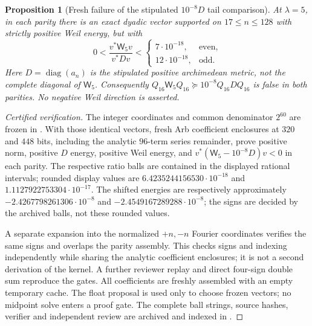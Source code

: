 \documentclass[11pt]{article}
\newtheorem{proposition}[theorem]{Proposition}
\theoremstyle{remark}
\begin{document}
\begin{proposition}[Fresh failure of the stipulated $10^{-8}D$ tail comparison]
\label{prop:v152-tail-comparison}
At $\lambda=5$, in each parity there is an exact dyadic vector supported
on $17\le n\le128$ with strictly positive Weil energy, but with
\[
 0<\frac{v^*\mathsf W_5v}{v^*Dv}
 <\begin{cases}7\cdot10^{-18},&\text{even},\\
               12\cdot10^{-18},&\text{odd}.
   \end{cases}
\]
Here $D=\operatorname{diag}(a_n)$ is the stipulated positive
archimedean metric, not the complete diagonal of $\mathsf W_5$.
Consequently $Q_{16}\mathsf W_5Q_{16}\succeq10^{-8}Q_{16}DQ_{16}$
is false in both parities. No negative Weil direction is asserted.
\end{proposition}
\begin{proof}[Certified verification]
The integer coordinates and common denominator $2^{60}$ are frozen in
. With those identical
vectors, fresh Arb coefficient enclosures at $320$ and $448$ bits,
including the analytic $96$-term series remainder, prove positive norm,
positive $D$ energy, positive Weil energy, and
$v^*(\mathsf W_5-10^{-8}D)v<0$ in each parity.
The respective ratio balls are contained in the displayed rational
intervals; rounded display values are
$6.4235244156530\cdot10^{-18}$ and
$1.1127922753304\cdot10^{-17}$.
The shifted energies are respectively approximately
$-2.4267798261306\cdot10^{-8}$ and
$-2.4549167289288\cdot10^{-8}$; the signs are decided by the
archived balls, not these rounded values.

A separate expansion into the normalized $+n,-n$ Fourier coordinates
verifies the same signs and overlaps the parity assembly. This checks
signs and indexing independently while sharing the analytic coefficient
enclosures; it is not a second derivation of the kernel. A further
reviewer replay and direct four-sign double sum reproduce the gates.
All coefficients are freshly assembled with an empty temporary cache.
The float proposal is used only to choose frozen vectors; no midpoint
solve enters a proof gate. The complete ball strings, source hashes,
verifier and independent review are archived and indexed in
.
\end{proof}
\end{document}

